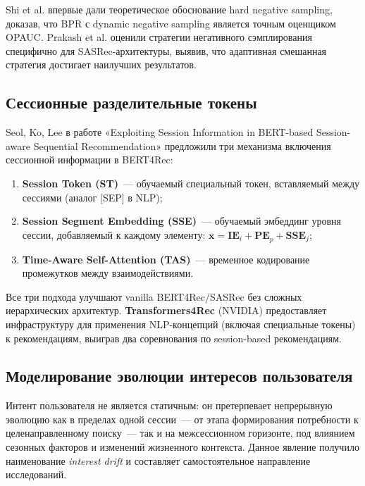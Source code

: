Shi et al. \cite{shi2023hardneg} впервые дали теоретическое обоснование hard negative sampling, доказав, что BPR с dynamic negative sampling является точным оценщиком OPAUC. Prakash et al. \cite{prakash2024neg} оценили стратегии негативного сэмплирования специфично для SASRec-архитектуры, выявив, что адаптивная смешанная стратегия достигает наилучших результатов.

\subsection{Сессионные разделительные токены}
\label{subsec:ch1:session_tokens}

Seol, Ko, Lee \cite{seol2022session} в работе «Exploiting Session Information in BERT-based Session-aware Sequential Recommendation» предложили три механизма включения сессионной информации в BERT4Rec:
\begin{enumerate}
    \item \textbf{Session Token (ST)}~--- обучаемый специальный токен, вставляемый между сессиями (аналог [SEP] в NLP);
    \item \textbf{Session Segment Embedding (SSE)}~--- обучаемый эмбеддинг уровня сессии, добавляемый к каждому элементу: $\mathbf{x} = \mathbf{IE}_i + \mathbf{PE}_p + \mathbf{SSE}_j$;
    \item \textbf{Time-Aware Self-Attention (TAS)}~--- временное кодирование промежутков между взаимодействиями.
\end{enumerate}
Все три подхода улучшают vanilla BERT4Rec/SASRec без сложных иерархических архитектур. \textbf{Transformers4Rec} \cite{moreira2021transformers4rec} (NVIDIA) предоставляет инфраструктуру для применения NLP-концепций (включая специальные токены) к рекомендациям, выиграв два соревнования по session-based рекомендациям.

\subsection{Моделирование эволюции интересов пользователя}
\label{subsec:ch1:interest_evolution}

Интент пользователя не является статичным: он претерпевает непрерывную эволюцию как в пределах одной сессии~--- от этапа формирования потребности к целенаправленному поиску~--- так и на межсессионном горизонте, под влиянием сезонных факторов и изменений жизненного контекста. Данное явление получило наименование \textit{interest drift} и составляет самостоятельное направление исследований.


